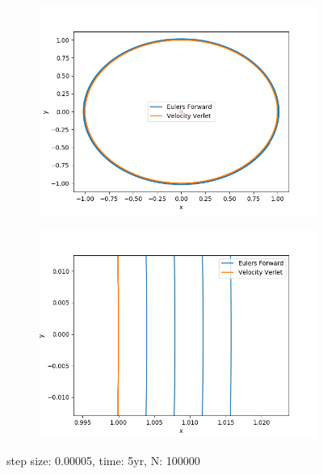 \documentclass{article}
\begin{document}
\begin{figure}[H]
  \centering
  \begin{subfigure}{0.5\textwidth}
    \centering
    \includegraphics[width=1.0\textwidth]{plots/compare_h00005.png}
  \end{subfigure}%
  \begin{subfigure}{0.5\textwidth}
    \centering
    \includegraphics[width=1.0\textwidth]{plots/compare_h00005_zoom.png}
  \end{subfigure}
  \caption{step size: 0.00005, time: 5yr, N: 100000}
\end{figure}
\end{document}
